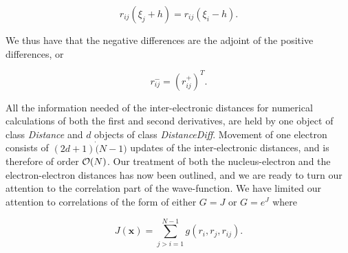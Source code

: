 \begin{equation*}
  r_{ij}(\xi_j+h) = r_{ij}(\xi_i-h).
\end{equation*}

We thus have that the negative differences are the adjoint of the
positive differences, or

\begin{equation}
  r_{ij}^- = (r_{ij}^+)^T.
\label{rijDiff}
\end{equation}

All the information needed of the inter-electronic distances for
numerical calculations of both the first and second derivatives, are
held by one object of class \emph{Distance} and $d$ objects of class
\emph{DistanceDiff}. Movement of one electron consists of
$(2d+1)\dot(N-1)$ updates of the inter-electronic distances, and is
therefore of order ${\cal O}(N)$. 
\newline
%
\newline
Our treatment of both the nucleus-electron and the electron-electron
distances has now been outlined, and we are ready to turn our
attention to the correlation part of the wave-function. We have
limited our attention to correlations of the form of either $G=J$ or
$G=e^J$ where

\begin{equation}
  J(\mathbf{x}) = \sum_{j>i=1}^{N-1} g(r_i, r_j, r_{ij}).
\label{JastrowExpression}
\end{equation}

